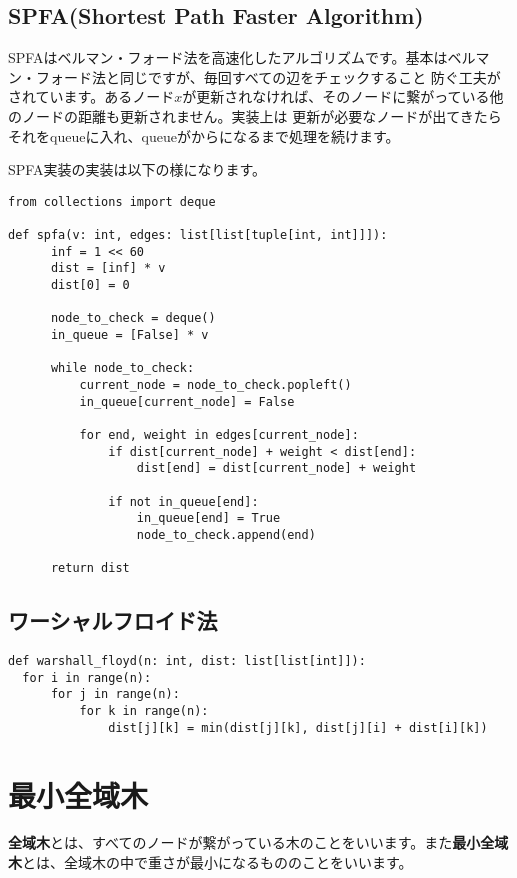 \newpage

\subsection{SPFA(Shortest Path Faster Algorithm)}
SPFAはベルマン・フォード法を高速化したアルゴリズムです。基本はベルマン・フォード法と同じですが、毎回すべての辺をチェックすること
防ぐ工夫がされています。あるノード$x$が更新されなければ、そのノードに繋がっている他のノードの距離も更新されません。実装上は
更新が必要なノードが出てきたらそれをqueueに入れ、queueがからになるまで処理を続けます。

SPFA実装の実装は以下の様になります。

\begin{lstlisting}[caption=SPFAの実装, label=spfa, frame=TRBL, label={spfa}]
from collections import deque

def spfa(v: int, edges: list[list[tuple[int, int]]]):
      inf = 1 << 60
      dist = [inf] * v
      dist[0] = 0
      
      node_to_check = deque()
      in_queue = [False] * v
      
      while node_to_check:
          current_node = node_to_check.popleft()
          in_queue[current_node] = False
          
          for end, weight in edges[current_node]:
              if dist[current_node] + weight < dist[end]:
                  dist[end] = dist[current_node] + weight 
              
              if not in_queue[end]:
                  in_queue[end] = True
                  node_to_check.append(end)
      
      return dist
\end{lstlisting}

\newpage

\subsection{ワーシャルフロイド法}
\begin{lstlisting}[caption=ワーシャルフロイド法の実装, label=warshall, frame=TRBL, label={warshall}]
def warshall_floyd(n: int, dist: list[list[int]]):
  for i in range(n):
      for j in range(n):
          for k in range(n):
              dist[j][k] = min(dist[j][k], dist[j][i] + dist[i][k])
\end{lstlisting}


\newpage

\section{最小全域木}
\textbf{全域木}とは、すべてのノードが繋がっている木のことをいいます。また\textbf{最小全域木}とは、全域木の中で重さが最小になるもののことをいいます。

